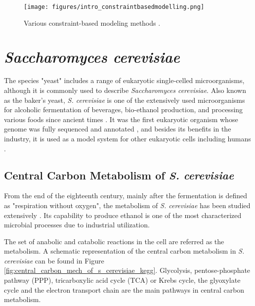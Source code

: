 \begin{figure}[H]
\begin{center}
\texttt{[image: figures/intro\_constraintbasedmodelling.png]}
\end{center}
\caption[Various constraint-based modeling methods \cite{lewis2012constraining}.]{Various constraint-based modeling methods \cite{lewis2012constraining}.}
\label{fig:intro_constraintbasedmodelling}
\end{figure}



\section{\emph{Saccharomyces cerevisiae}}

The species "yeast" includes a range of eukaryotic single-celled microorganisms, although it is commonly used to describe \emph{Saccharomyces cerevisiae}. Also known as the baker's yeast, \emph{S. cerevisiae} is one of the extensively used microorganisms for alcoholic fermentation of beverages, bio-ethanol production, and processing various foods since ancient times \cite{gelinas2009inventions}. It was the first eukaryotic organism whose genome was fully sequenced and annotated \cite{goffeau1997multidrug}, and besides its benefits in the industry, it is used as a model system for other eukaryotic cells including humans \cite{dujon1996yeast, botstein1997yeast}.

\subsection{Central Carbon Metabolism of \emph{S. cerevisiae}}
From the end of the eighteenth century, mainly after the fermentation is defined as "respiration without oxygen", the metabolism of \emph{S. cerevisiae} has been studied extensively \cite{barnett1998history, barnett2000history}. Its capability to produce ethanol is one of the most characterized microbial processes due to industrial utilization.

The set of anabolic and catabolic reactions in the cell are referred as the metabolism. A schematic representation of the central carbon metabolism in \emph{S. cerevisiae} can be found in Figure \ref{fig:central_carbon_mech_of_s_cerevisiae_kegg}. Glycolysis, pentose-phosphate pathway (PPP), tricarboxylic acid cycle (TCA) or Krebs cycle, the glyoxylate cycle and the electron transport chain are the main pathways in central carbon metabolism.

